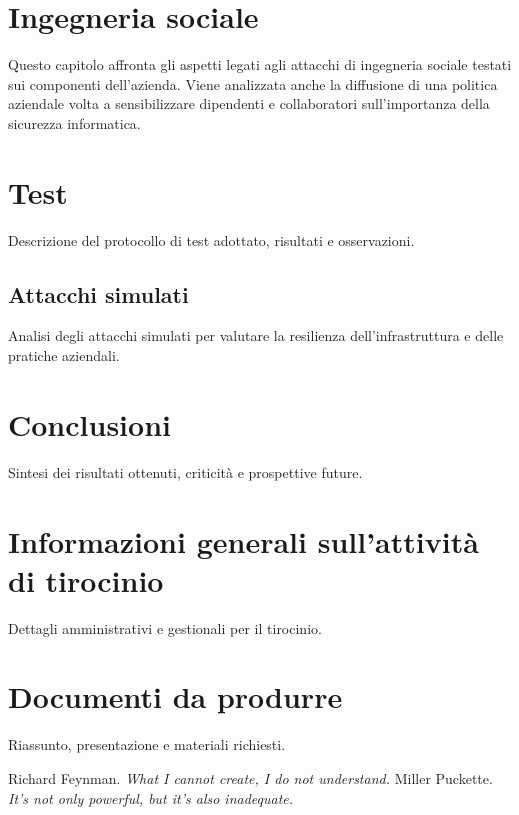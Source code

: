 \documentclass[a4paper,12pt]{book}
\begin{document}
\chapter{Ingegneria sociale}
Questo capitolo affronta gli aspetti legati agli attacchi di ingegneria sociale testati sui componenti dell'azienda. Viene analizzata anche la diffusione di una politica aziendale volta a sensibilizzare dipendenti e collaboratori sull'importanza della sicurezza informatica.

\chapter{Test}
Descrizione del protocollo di test adottato, risultati e osservazioni.

\section{Attacchi simulati}
Analisi degli attacchi simulati per valutare la resilienza dell'infrastruttura e delle pratiche aziendali.

\chapter{Conclusioni}
Sintesi dei risultati ottenuti, criticità e prospettive future.

\appendix
\chapter{Informazioni generali sull'attività di tirocinio}
Dettagli amministrativi e gestionali per il tirocinio.

\chapter{Documenti da produrre}
Riassunto, presentazione e materiali richiesti.

\begin{thebibliography}{9}
 Richard Feynman. \textit{What I cannot create, I do not understand.}
 Miller Puckette. \textit{It’s not only powerful, but it’s also inadequate.}
\end{thebibliography}
\end{document}
